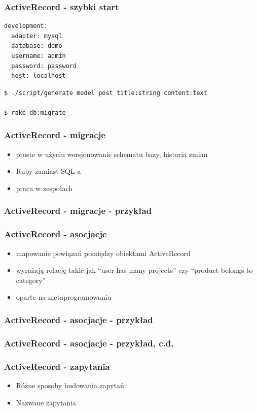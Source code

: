 \documentclass[12t]{beamer}
\begin{document}
\begin{frame}[fragile]
  \frametitle{ActiveRecord - szybki start}
\begin{verbatim}
development:
  adapter: mysql
  database: demo
  username: admin
  password: password
  host: localhost
\end{verbatim}
\begin{verbatim}
$ ./script/generate model post title:string content:text

$ rake db:migrate
\end{verbatim}
  
\end{frame}

\begin{frame}
  \frametitle{ActiveRecord - migracje}
  \begin{itemize}
  \item proste w użyciu wersjonowanie schematu bazy, historia zmian
  \item Ruby zamiast SQL-a
  \item praca w zespołach
  \end{itemize}
\end{frame}

\begin{frame}[fragile]
  \frametitle{ActiveRecord - migracje - przykład}
  
\end{frame}

\begin{frame}
  \frametitle{ActiveRecord - asocjacje}
  \begin{itemize}
  \item mapowanie powiązań pomiędzy obiektami ActiveRecord
  \item wyrażają relację takie jak “user has many projects” czy
    “product belongs to category”
  \item oparte na metaprogramowaniu
  \end{itemize}
\end{frame}

\begin{frame}[fragile]
  \frametitle{ActiveRecord - asocjacje - przykład}
  
\end{frame}

\begin{frame}[fragile]
  \frametitle{ActiveRecord - asocjacje - przykład, c.d.}
  
\end{frame}

\begin{frame}
  \frametitle{ActiveRecord - zapytania}
  \begin{itemize}
  \item Różne sposoby budowania zapytań
  \item Nazwane zapytania
  \end{itemize}
\end{frame}
\end{document}
